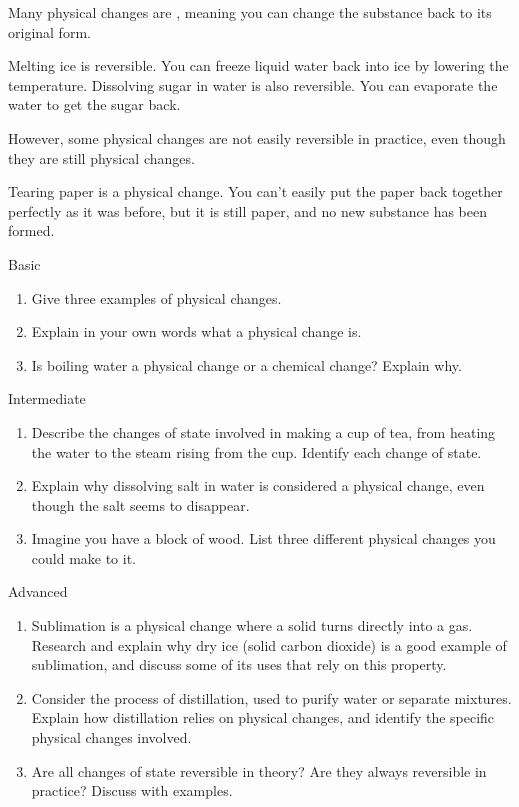 Many physical changes are , meaning you can change the substance back to its original form.

\begin{example}
Melting ice is reversible. You can freeze liquid water back into ice by lowering the temperature. Dissolving sugar in water is also reversible. You can evaporate the water to get the sugar back.
\end{example}

However, some physical changes are not easily reversible in practice, even though they are still physical changes.

\begin{example}
Tearing paper is a physical change. You can't easily put the paper back together perfectly as it was before, but it is still paper, and no new substance has been formed.
\end{example}

\begin{tieredquestions}{Basic}
\begin{enumerate}
    \item Give three examples of physical changes.
    \item Explain in your own words what a physical change is.
    \item Is boiling water a physical change or a chemical change? Explain why.
\end{enumerate}
\end{tieredquestions}

\begin{tieredquestions}{Intermediate}
\begin{enumerate}
    \item Describe the changes of state involved in making a cup of tea, from heating the water to the steam rising from the cup. Identify each change of state.
    \item Explain why dissolving salt in water is considered a physical change, even though the salt seems to disappear.
    \item  Imagine you have a block of wood. List three different physical changes you could make to it.
\end{enumerate}
\end{tieredquestions}

\begin{tieredquestions}{Advanced}
\begin{enumerate}
    \item  Sublimation is a physical change where a solid turns directly into a gas. Research and explain why dry ice (solid carbon dioxide) is a good example of sublimation, and discuss some of its uses that rely on this property.
    \item  Consider the process of distillation, used to purify water or separate mixtures. Explain how distillation relies on physical changes, and identify the specific physical changes involved.
    \item  Are all changes of state reversible in theory? Are they always reversible in practice? Discuss with examples.
\end{enumerate}
\end{tieredquestions}


